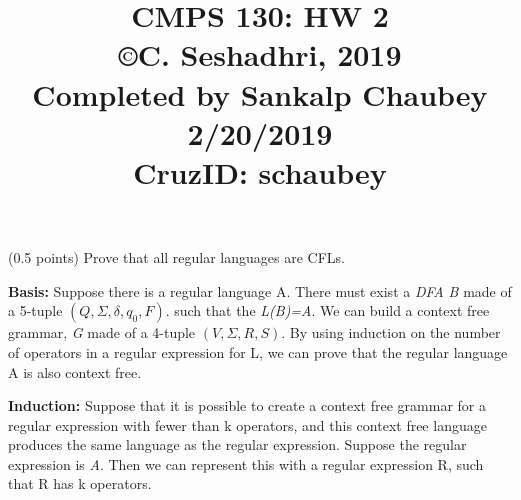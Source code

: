 \documentclass{article}
\title{CMPS 130: HW 2 \\ {\small \copyright C. Seshadhri, 2019}\\ {\small Completed by Sankalp Chaubey} \\ {\small 2/20/2019} \\ {\small CruzID: schaubey} }
\date{}
\begin{document}
\maketitle


\medskip

\begin{compactenum}
\item (0.5 points) Prove that all regular languages are CFLs. \medskip

\textbf{Basis: } Suppose there is a regular language A. There must exist a  \emph { DFA B}  made of a 5-tuple $(Q,\Sigma,\delta,q_0,F)$. 
such that the \emph {L(B)=A}. We can build a context free grammar, \emph {G}  made of a 4-tuple $(V,\Sigma,R,S)$. By using induction on the number of operators in a regular expression for L, we can prove that the regular language A is also context free. \medskip

\textbf{Induction: } Suppose that it is possible to create a context free grammar for a regular expression with fewer than k operators, and this context free language produces the same language as the regular expression. Suppose the regular expression is \emph{A}. Then we can represent this with a regular expression R, such that R has k operators. \medskip


\end{compactenum}
\end{document}
